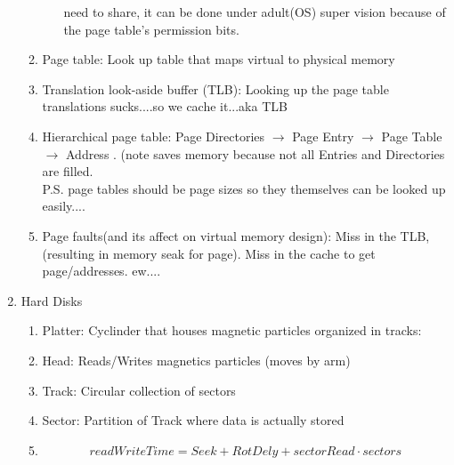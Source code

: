\documentclass[12pt]{article}
\renewcommand{\=}[1]{\stackrel{#1}{=}} %
\theoremstyle{definition}
\theoremstyle{remark}
\begin{document}
\begin{enumerate}
\begin{enumerate}
\begin{enumerate}
        need to share, it can be done under adult(OS) super vision
        because of the page table's permission bits.
      \end{enumerate}
    \item Page table: Look up table that maps virtual to physical memory
    \item Translation look-aside buffer (TLB): Looking up the page
      table translations sucks....so we cache it...aka TLB 
    \item Hierarchical page table: Page Directories $\rightarrow$ Page
      Entry $\rightarrow$ Page Table $\rightarrow$ Address . (note
      saves memory because not all Entries and Directories are
      filled.\\
      P.S. page tables should be page sizes so they themselves can be
      looked up easily....
    \item Page faults(and its affect on virtual memory design): Miss
      in the TLB, (resulting in memory seak for page). Miss in the
      cache to get page/addresses. ew....  
    \end{enumerate}
  \item Hard Disks
    \begin{enumerate}
    \item Platter: Cyclinder that houses magnetic particles organized
      in tracks:
    \item Head: Reads/Writes magnetics particles (moves by arm)
    \item Track: Circular collection of sectors
    \item Sector: Partition of Track where data is actually stored
    \item 
      \begin{equation}
        readWriteTime = Seek+RotDely +sectorRead\cdot sectors
      \end{equation}


\end{enumerate}
\end{enumerate}
\end{document}

